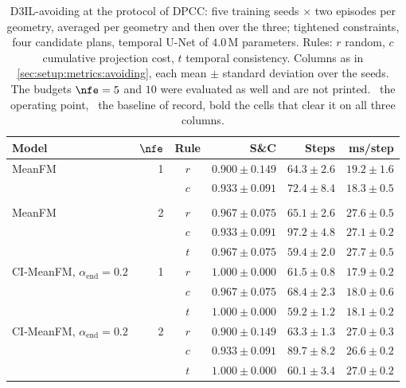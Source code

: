 \begin{table}[htpb]
  \caption[The generative models at the protocol of DPCC]{D3IL-avoiding at the protocol of \ac{DPCC}:
  five training seeds $\times$ two episodes per geometry, averaged per geometry and then over the three;
  tightened constraints, four candidate plans, temporal U-Net of $4.0$\,M parameters. Rules: $r$ random,
  $c$ cumulative projection cost, $t$ temporal consistency. Columns as in
  \autoref{sec:setup:metrics:avoiding}, each mean $\pm$ standard deviation over the seeds. The budgets
  $\nfe=5$ and $10$ were evaluated as well and are not printed. \selectedmark\ the operating
  point, \baselinemark\ the baseline of record, bold the cells that clear it on all three columns.}
  \label{tab:avoiding-dpcc-protocol}
  \centering
  \footnotesize
  \begin{tabularx}{\linewidth}{@{}L r c rrr@{}}
    \toprule
    Model & $\nfe$ & Rule & S\&C & Steps & ms/step \\
    \midrule
    MeanFM     & 1 & $r$ & $0.900 \pm 0.149$ & $64.3 \pm 2.6$ & $19.2 \pm 1.6$ \\
                     &    & $c$ & $0.933 \pm 0.091$ & $72.4 \pm 8.4$ & $18.3 \pm 0.5$ \\
                     &    &  &  &  &   \\
    MeanFM     & 2 & $r$ & $0.967 \pm 0.075$ & $65.1 \pm 2.6$ & $27.6 \pm 0.5$ \\
                     &    & $c$ & $0.933 \pm 0.091$ & $97.2 \pm 4.8$ & $27.1 \pm 0.2$ \\
                     &    & $t$ & $0.967 \pm 0.075$ & $59.4 \pm 2.0$ & $27.7 \pm 0.5$ \\
    \midrule
    CI-MeanFM, $\alpha_{\mathrm{end}}=0.2$ & 1 & $r$ & $1.000 \pm 0.000$ & $61.5 \pm 0.8$ & $17.9 \pm 0.2$ \\
                     &    & $c$ & $0.967 \pm 0.075$ & $68.4 \pm 2.3$ & $18.0 \pm 0.6$ \\
                     &    & \textbf{$t$} & \textbf{$1.000 \pm 0.000$} & \textbf{$59.2 \pm 1.2$} & \textbf{$18.1 \pm 0.2$} \\
    CI-MeanFM, $\alpha_{\mathrm{end}}=0.2$ & 2 & $r$ & $0.900 \pm 0.149$ & $63.3 \pm 1.3$ & $27.0 \pm 0.3$ \\
                     &    & $c$ & $0.933 \pm 0.091$ & $89.7 \pm 8.2$ & $26.6 \pm 0.2$ \\
                     &    & $t$ & $1.000 \pm 0.000$ & $60.1 \pm 3.4$ & $27.0 \pm 0.2$ \\

\end{tabularx}
\end{table}
